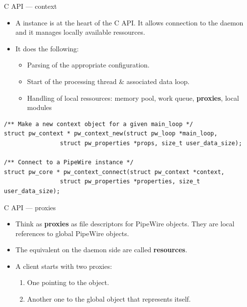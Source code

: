 \begin{frame}[fragile]{C API — context}
  \begin{itemize}

  \item A  instance is at the heart of the C API. It
    allows connection to the daemon and it manages locally available
    ressources.

  \item It does the following:

    \begin{itemize}
    \item Parsing of the appropriate configuration.
    \item Start of the processing thread \& associated data loop.
    \item Handling of local ressources: memory pool, work queue,
      \textbf{proxies}, local modules
    \end{itemize}

  \end{itemize}

      \begin{block}{}
        \fontsize{9}{9}\selectfont
          \begin{verbatim}
/** Make a new context object for a given main_loop */
struct pw_context * pw_context_new(struct pw_loop *main_loop,
                struct pw_properties *props, size_t user_data_size);

/** Connect to a PipeWire instance */
struct pw_core * pw_context_connect(struct pw_context *context,
                struct pw_properties *properties, size_t user_data_size);
          \end{verbatim}
      \end{block}
\end{frame}



\begin{frame}{C API — proxies}
  \begin{itemize}

  \item Think as \textbf{proxies} as file descriptors for PipeWire
    objects. They are local references to global PipeWire objects.

  \item The equivalent on the daemon side are called \textbf{resources}.

  \item A client starts with two proxies:

    \begin{enumerate}
    \item One pointing to the  object.
    \item Another one to the global  object that represents
      itself.
    \end{enumerate}

  \end{itemize}
\end{frame}



